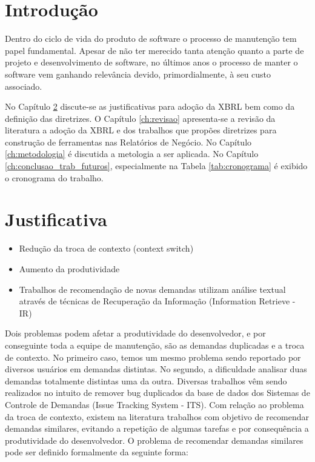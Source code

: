 \documentclass[msc,proposal,hidelot,hideabstract]{ppgccufmg} %
\begin{document}
\chapter{Introdução}
\label{ch:intro}
Dentro do ciclo de vida do produto de software o processo de manutenção tem
papel fundamental. Apesar de não ter merecido tanta atenção quanto a parte de
projeto e desenvolvimento de software, no últimos anos o processo de manter o
software vem ganhando relevância devido, primordialmente, à seu custo
associado.

No Capítulo \ref{ch:justificativa} discute-se as justificativas para adoção da
XBRL bem como da definição das diretrizes. O Capítulo \ref{ch:revisao}
apresenta-se a revisão da literatura a adoção da XBRL e dos trabalhos que
propões diretrizes para construção de ferramentas nas Relatórios de Negócio. No
Capítulo \ref{ch:metodologia} é discutida a metologia a ser aplicada. No
Capítulo \ref{ch:conclusao_trab_futuros}, especialmente na Tabela \ref{tab:cronograma} é exibido o cronograma do trabalho.

\chapter{Justificativa}
\label{ch:justificativa}

\begin{itemize}
\item Redução da troca de contexto (context switch)
\item Aumento da produtividade
\item Trabalhos de recomendação de novas demandas utilizam análise textual através de técnicas de Recuperação da Informação (Information Retrieve - IR)
\end{itemize}

Dois problemas podem afetar a produtividade do desenvolvedor, e por conseguinte
toda a equipe de manutenção, são as demandas duplicadas e a troca de
contexto. No primeiro caso, temos um mesmo problema sendo reportado por
diversos usuários em demandas distintas. No segundo, a dificuldade analisar
duas demandas totalmente distintas uma da outra. Diversas trabalhos vêm sendo
realizados no intuito de remover bug duplicados da base de dados dos Sistemas
de Controle de Demandas (Issue Tracking System - ITS).
Com relação ao problema da troca de contexto, existem na literatura trabalhos
com objetivo de recomendar demandas similares, evitando a repetição de algumas
tarefas e por consequência a produtividade do desenvolvedor.
O problema de recomendar demandas similares pode ser definido formalmente da
seguinte forma:
\end{document}

